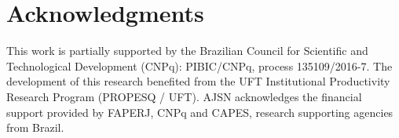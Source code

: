 \section*{Acknowledgments}\label{sec:Acknowledgment}

This work is partially supported by the Brazilian Council for Scientific and Technological Development (CNPq): PIBIC/CNPq, process 135109/2016-7. The development of this research benefited from the UFT Institutional Productivity Research Program (PROPESQ / UFT). AJSN acknowledges the financial support provided by FAPERJ, CNPq and CAPES, research supporting agencies from Brazil.

	